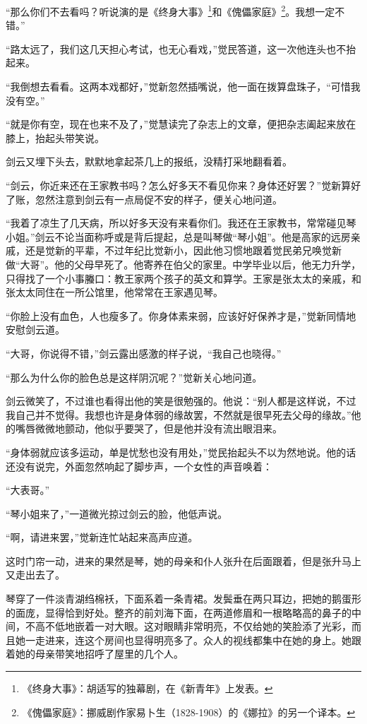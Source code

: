 \par “那么你们不去看吗？听说演的是《终身大事》\footnote{《终身大事》：胡适写的独幕剧，在《新青年》上发表。}和《傀儡家庭》\footnote{《傀儡家庭》：挪威剧作家易卜生（1828-1908）的《娜拉》的另一个译本。}。我想一定不错。”
\par “路太远了，我们这几天担心考试，也无心看戏，”觉民答道，这一次他连头也不抬起来。
\par “我倒想去看看。这两本戏都好，”觉新忽然插嘴说，他一面在拨算盘珠子，“可惜我没有空。”
\par “就是你有空，现在也来不及了，”觉慧读完了杂志上的文章，便把杂志阖起来放在膝上，抬起头带笑说。
\par 剑云又埋下头去，默默地拿起茶几上的报纸，没精打采地翻看着。
\par “剑云，你近来还在王家教书吗？怎么好多天不看见你来？身体还好罢？”觉新算好了账，忽然注意到剑云有一点局促不安的样子，便关心地问道。
\par “我着了凉生了几天病，所以好多天没有来看你们。我还在王家教书，常常碰见琴小姐。”剑云不论当面称呼或是背后提起，总是叫琴做“琴小姐”。他是高家的远房亲戚，还是觉新的平辈，不过年纪比觉新小，因此他习惯地跟着觉民弟兄唤觉新做“大哥”。他的父母早死了。他寄养在伯父的家里。中学毕业以后，他无力升学，只得找了一个小事螣口：教王家两个孩子的英文和算学。王家是张太太的亲戚，和张太太同住在一所公馆里，他常常在王家遇见琴。
\par “你脸上没有血色，人也瘦多了。你身体素来弱，应该好好保养才是，”觉新同情地安慰剑云道。
\par “大哥，你说得不错，”剑云露出感激的样子说，“我自己也晓得。”
\par “那么为什么你的脸色总是这样阴沉呢？”觉新关心地问道。
\par 剑云微笑了，不过谁也看得出他的笑是很勉强的。他说：“别人都是这样说，不过我自己并不觉得。我想也许是身体弱的缘故罢，不然就是很早死去父母的缘故。”他的嘴唇微微地颤动，他似乎要哭了，但是他并没有流出眼泪来。
\par “身体弱就应该多运动，单是忧愁也没有用处，”觉民抬起头不以为然地说。他的话还没有说完，外面忽然响起了脚步声，一个女性的声音唤着：
\par “大表哥。”
\par “琴小姐来了，”一道微光掠过剑云的脸，他低声说。
\par “啊，请进来罢，”觉新连忙站起来高声应道。
\par 这时门帘一动，进来的果然是琴，她的母亲和仆人张升在后面跟着，但是张升马上又走出去了。
\par 琴穿了一件淡青湖绉棉袄，下面系着一条青裙。发鬓垂在两只耳边，把她的鹅蛋形的面庞，显得恰到好处。整齐的前刘海下面，在两道修眉和一根略略高的鼻子的中间，不高不低地嵌着一对大眼。这对眼睛非常明亮，不仅给她的笑脸添了光彩，而且她一走进来，连这个房间也显得明亮多了。众人的视线都集中在她的身上。她跟着她的母亲带笑地招呼了屋里的几个人。
